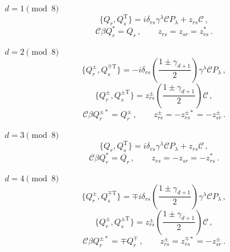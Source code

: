 \medskip
\noindent \(d=1\pmod 8\)
\begin{equation}
  \{Q_r,Q_s^{\mathrm T}\}
  =i\delta_{rs}\gamma^\lambda\mathcal C P_\lambda+z_{rs}\mathcal C\,,
  \tag{32.1.32}\label{eq:32.1.32}
\end{equation}
\begin{equation}
  \mathcal C\beta Q_r^*=Q_r\,,
  \qquad z_{rs}=z_{sr}=z_{rs}^*\,.
  \tag{32.1.33}\label{eq:32.1.33}
\end{equation}

\medskip
\noindent \(d=2\pmod 8\)
\begin{equation}
  \{Q_r^\pm,Q_s^{\mp\mathrm T}\}
  =-i\delta_{rs}
  \left(\frac{1\pm\gamma_{d+1}}{2}\right)
  \gamma^\lambda\mathcal C P_\lambda\,,
  \tag{32.1.34}\label{eq:32.1.34}
\end{equation}
\begin{equation}
  \{Q_r^\pm,Q_s^{\pm\mathrm T}\}
  =z_{rs}^{\pm}
  \left(\frac{1\pm\gamma_{d+1}}{2}\right)\mathcal C\,,
  \tag{32.1.35}\label{eq:32.1.35}
\end{equation}
\begin{equation}
  \mathcal C\beta Q_r^{\pm*}=Q_r^\pm\,,
  \qquad
  z_{rs}^{\pm}=-z_{rs}^{\pm*}=-z_{sr}^{\pm}\,.
  \tag{32.1.36}\label{eq:32.1.36}
\end{equation}

\medskip
\noindent \(d=3\pmod 8\)
\begin{equation}
  \{Q_r,Q_s^{\mathrm T}\}
  =i\delta_{rs}\gamma^\lambda\mathcal C P_\lambda+z_{rs}\mathcal C\,,
  \tag{32.1.37}\label{eq:32.1.37}
\end{equation}
\begin{equation}
  \mathcal C\beta Q_r^*=Q_r\,,
  \qquad z_{rs}=-z_{sr}=-z_{rs}^*\,.
  \tag{32.1.38}\label{eq:32.1.38}
\end{equation}

\medskip
\noindent \(d=4\pmod 8\)
\begin{equation}
  \{Q_r^\pm,Q_s^{\mp\mathrm T}\}
  =\mp i\delta_{rs}
  \left(\frac{1\pm\gamma_{d+1}}{2}\right)
  \gamma^\lambda\mathcal C P_\lambda\,,
  \tag{32.1.39}\label{eq:32.1.39}
\end{equation}
\begin{equation}
  \{Q_r^\pm,Q_s^{\pm\mathrm T}\}
  =z_{rs}^{\pm}
  \left(\frac{1\pm\gamma_{d+1}}{2}\right)\mathcal C\,,
  \tag{32.1.40}\label{eq:32.1.40}
\end{equation}
\begin{equation}
  \mathcal C\beta Q_r^{\pm*}=\mp Q_r^\mp\,,
  \qquad
  z_{rs}^{\pm}=z_{rs}^{\mp*}=-z_{sr}^{\pm}\,.
  \tag{32.1.41}\label{eq:32.1.41}
\end{equation}

